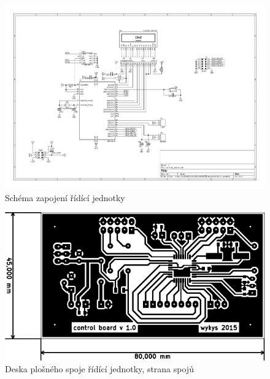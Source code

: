 \begin{landscape}
	\begin{figure}[h]
		\centering 	
		\includegraphics[height=\textwidth]{img/cu/sch.pdf}
		\caption{Schéma zapojení řídící jednotky}	
	\end{figure}
\end{landscape}
%

\begin{figure}[H]
	\centering
	\includegraphics[width=170mm]{img/cu/cu_b.pdf}
	\caption{Deska plošného spoje řídící jednotky, strana spojů}    		
\end{figure}

